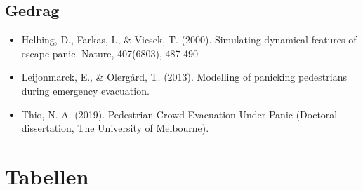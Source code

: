 \documentclass[12pt, letterpaper]{article}
\begin{document}
\begin{appendices}
\subsection{Gedrag} \label{bronnenberekeningen}
\begin{itemize}
    \item Helbing, D., Farkas, I., \& Vicsek, T. (2000). Simulating dynamical features of escape panic. Nature, 407(6803), 487-490
    \item Leijonmarck, E., \& Olergård, T. (2013). Modelling of panicking pedestrians during emergency evacuation.
    \item Thio, N. A. (2019). Pedestrian Crowd Evacuation Under Panic (Doctoral dissertation, The University of Melbourne).
\end{itemize}

\newpage
\section{Tabellen} \label{tabellen}
\begin{table}[H]
    \begin{center}
    {\selectfont
        \caption{p-waarden verdachten}
        }
\end{center}
\end{table}
\end{appendices}
\end{document}
